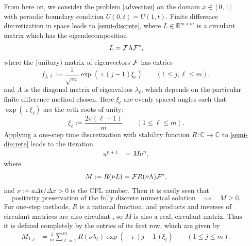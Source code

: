 \documentclass[a4paper]{article}
\newcommand{\dt}{\Delta t}
\newcommand{\dx}{\Delta x}
\newcommand{\cF}{{\cal{F}}}
\begin{document}
From here on, we consider the problem \eqref{advection} on the domain $x\in[0,1]$
with periodic boundary condition $U(0,t)=U(1,t)$.  Finite difference discretization
in space leads to \eqref{semi-discrete}, where $L\in\mathbb{R}^{m\times m}$ is a circulant matrix  \cite[Section 5.16]{matmat}
which has the eigendecomposition
\[
    L  = \cF \Lambda \cF^*,
\]
where the (unitary) matrix of eigenvectors $\cF$ has entries
\[
    f_{j,\ell}  := \frac{1}{\sqrt{m}}\exp(\imath  (j-1) \xi_\ell)  \quad\quad (1 \le j, \ell \le m),
\]
and $\Lambda$ is the diagonal matrix of eigenvalues $\lambda_\ell$, which depends on the
particular finite difference method chosen.  Here $\xi_\ell$ are evenly
spaced angles such that $\exp(\imath\xi_\ell)$ are the $m$th roots of unity:
\[
    \xi_\ell  := \frac{2\pi(\ell-1)}{m} \quad\quad (1 \le \ell \le m).
\]
Applying a one-step time
discretization with stability function $R:\mathbb{C}\to\mathbb{C}$ to \eqref{semi-discrete} leads to
the iteration
\begin{align} \label{M}
    u^{n+1} & = M u^n,
\end{align}
where 
\begin{equation}\label{Mdualdef}
M:=R(\nu L)=\cF R(\nu \Lambda) \cF^*, 
\end{equation}
and $\nu:=a\dt/\dx>0$ is the CFL number.  
Then it is easily seen that 
\[
\text{positivity preservation of the fully discrete numerical solution}\quad \Longleftrightarrow \quad M\ge 0.
\]
For one-step methods, $R$ is a rational function, and products and inverses of circulant matrices are also circulant \cite[Fact 5.16.7]{matmat}, so
$M$ is also a real, circulant matrix.
Thus it is defined completely by the entries of its first row, which
are given by
\begin{align} \label{M-entries}
    M_{1,j} & = \frac{1}{m} \sum_{\ell=1}^m R(\nu\lambda_\ell) \exp(-\imath(j-1)\xi_\ell) \quad\quad (1\le j\le m).
\end{align}
\end{document}
